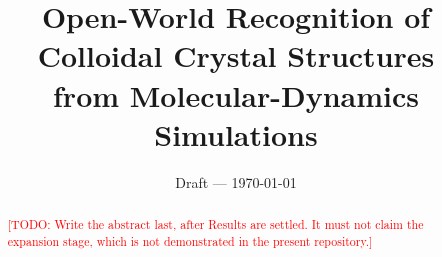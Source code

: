 \documentclass[11pt,a4paper]{article}
\title{Open-World Recognition of Colloidal Crystal Structures\\
from Molecular-Dynamics Simulations}
\author{\TODO{author list}}
\date{Draft --- \today}
\newcommand{\TODO}[1]{\textcolor{red}{[TODO: #1]}}
\begin{document}
\maketitle

\begin{abstract}
\TODO{Write the abstract last, after Results are settled. It must not claim the
expansion stage, which is not demonstrated in the present repository.}
\end{abstract}









\end{document}
